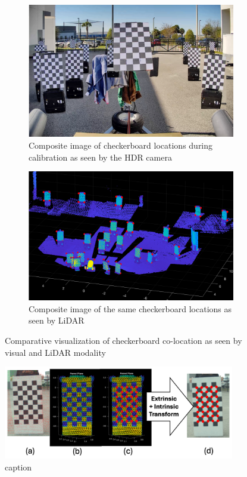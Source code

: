 \documentclass{erauthesis}
\begin{document}
\begin{figure}[htbp]
\centering
\begin{subfigure}[t]{0.45\textwidth}
    \centering
    \includegraphics[width=\textwidth]{Images/checkerboard.png}
    \caption{Composite image of checkerboard locations during calibration as seen by the HDR camera}
    \label{fig:chkrbds_vision}
\end{subfigure}
\hfill
\begin{subfigure}[t]{0.45\textwidth}
    \centering
    \includegraphics[width=\textwidth]{Images/lidar_calib.png}
    \caption{Composite image of the same checkerboard locations as seen by LiDAR}
    \label{fig:chkrbds_lidar}
\end{subfigure}
\caption{Comparative visualization of checkerboard co-location as seen by visual and LiDAR modality}
\label{fig:camera_calib}
\end{figure}

\begin{figure}[htbp]
    \centering
    \includegraphics[width=0.9\textwidth]{Images/transform.png}
    \caption{caption}
    \label{fig:lidar_cam_calibration}
\end{figure}
\end{document}

